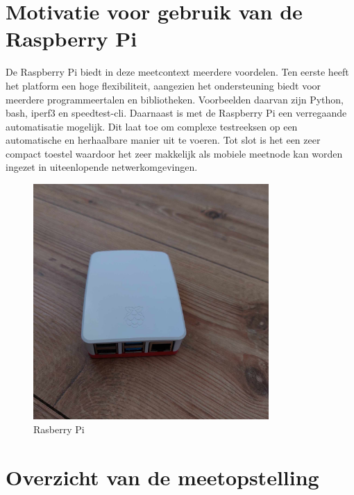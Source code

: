 \section{Motivatie voor gebruik van de Raspberry Pi}

De Raspberry Pi biedt in deze meetcontext meerdere voordelen. Ten eerste heeft het platform een hoge flexibiliteit, aangezien het ondersteuning biedt voor meerdere programmeertalen en bibliotheken. Voorbeelden daarvan zijn Python, bash, iperf3 en speedtest-cli. Daarnaast is met de Raspberry Pi een verregaande automatisatie mogelijk. Dit laat toe om complexe testreeksen op een automatische en herhaalbare manier uit te voeren. Tot slot is het een zeer compact toestel waardoor het zeer makkelijk als mobiele meetnode kan worden ingezet in uiteenlopende netwerkomgevingen.

\begin{figure}
    \includegraphics[width=0.8\textwidth]{../graphics/Rasberry_pi.jpg}
    \caption[Rasberry Pi]{\label{fig:rasberrypi}Rasberry Pi}
\end{figure}

\section{Overzicht van de meetopstelling}

